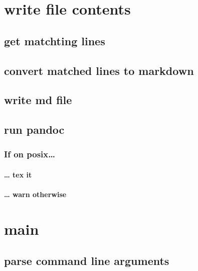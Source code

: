 \documentclass[]{article}
\begin{document}
\section{write file contents}\label{write-file-contents}

\subsection{get matchting lines}\label{get-matchting-lines}

\subsection{convert matched lines to
markdown}\label{convert-matched-lines-to-markdown}

\subsection{write md file}\label{write-md-file}

\subsection{run pandoc}\label{run-pandoc}

\subsubsection{If on posix\ldots{}}\label{if-on-posix}

\paragraph{\ldots{} tex it}\label{tex-it}

\paragraph{\ldots{} warn otherwise}\label{warn-otherwise}

\section{main}\label{main}

\subsection{parse command line
arguments}\label{parse-command-line-arguments}
\end{document}
